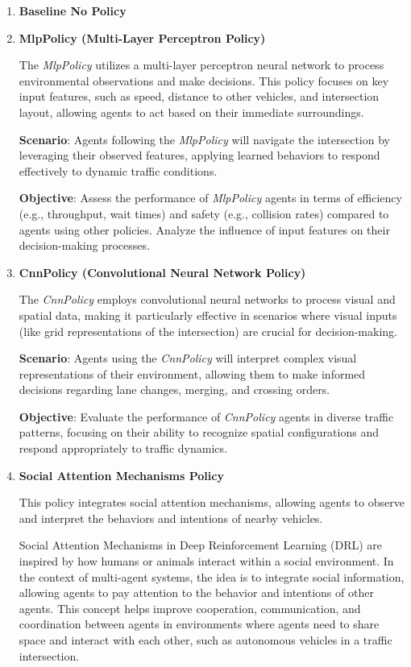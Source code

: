 \begin{enumerate}
    \item\textbf{Baseline {No Policy}}

    \item\textbf{MlpPolicy (Multi-Layer Perceptron Policy)}
    
    The \textit{MlpPolicy} utilizes a multi-layer perceptron neural network to process environmental observations and make decisions. This policy focuses on key input features, such as speed, distance to other vehicles, and intersection layout, allowing agents to act based on their immediate surroundings.

    \textbf{Scenario}: Agents following the \textit{MlpPolicy} will navigate the intersection by leveraging their observed features, applying learned behaviors to respond effectively to dynamic traffic conditions.

    \textbf{Objective}: Assess the performance of \textit{MlpPolicy} agents in terms of efficiency (e.g., throughput, wait times) and safety (e.g., collision rates) compared to agents using other policies. Analyze the influence of input features on their decision-making processes.

    \item\textbf{CnnPolicy (Convolutional Neural Network Policy)}
    
    The \textit{CnnPolicy} employs convolutional neural networks to process visual and spatial data, making it particularly effective in scenarios where visual inputs (like grid representations of the intersection) are crucial for decision-making.

    \textbf{Scenario}: Agents using the \textit{CnnPolicy} will interpret complex visual representations of their environment, allowing them to make informed decisions regarding lane changes, merging, and crossing orders.

    \textbf{Objective}: Evaluate the performance of \textit{CnnPolicy} agents in diverse traffic patterns, focusing on their ability to recognize spatial configurations and respond appropriately to traffic dynamics.

    \item\textbf{Social Attention Mechanisms Policy}
    
    This policy integrates social attention mechanisms, allowing agents to observe and interpret the behaviors and intentions of nearby vehicles. 

Social Attention Mechanisms in Deep Reinforcement Learning (DRL) are inspired by how humans or animals interact within a social environment.
In the context of multi-agent systems, the idea is to integrate social information, allowing agents to pay attention to the behavior and 
intentions of other agents.\cite{sutton2018reinforcement}
This concept helps improve cooperation, communication, and coordination between agents in environments where agents need to share space and interact with each other, such as autonomous vehicles in a traffic intersection.



\end{enumerate}
